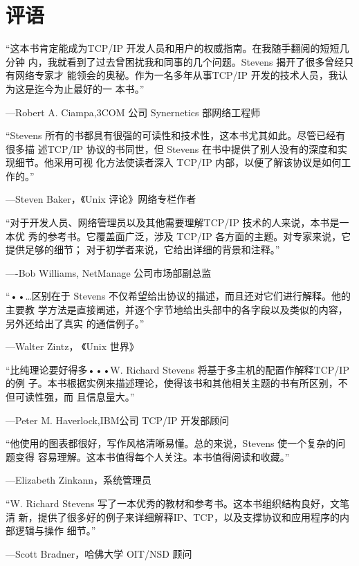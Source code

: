 

\chapter*{评语}
“这本书肯定能成为TCP/IP 开发人员和用户的权威指南。在我随手翻阅的短短几分钟
内，我就看到了过去曾困扰我和同事的几个问题。Stevens 揭开了很多曾经只有网络专家才
能领会的奥秘。作为一名多年从事TCP/IP 开发的技术人员，我认为这是迄今为止最好的一
本书。”
\begin{flushright}
    —Robert A. Ciampa,3COM 公司 Synernetics 部网络工程师
\end{flushright}

“Stevens 所有的书都具有很强的可读性和技术性，这本书尤其如此。尽管已经有很多描
述TCP/IP 协议的书同世，但 Stevens 在书中提供了别人没有的深度和实现细节。他采用可视
化方法使读者深入 TCP/IP 内部，以便了解该协议是如何工作的。”
\begin{flushright}
    —Steven Baker，《Unix 评论》网络专栏作者
\end{flushright}

“对于开发人员、网络管理员以及其他需要理解TCP/IP 技术的人来说，本书是一本优
秀的参考书。它覆盖面广泛，涉及 TCP/IP 各方面的主题。对专家来说，它提供足够的细节；
对于初学者来说，它给出详细的背景和注释。”
\begin{flushright}
    —-Bob Williams, NetManage 公司市场部副总监
\end{flushright}

“••…区别在于 Stevens 不仅希望给出协议的描述，而且还对它们进行解释。他的主要教
学方法是直接阐述，并逐个字节地给出头部中的各字段以及类似的内容，另外还给出了真实
的通信例子。”
\begin{flushright}
    —Walter Zintz， 《Unix 世界》
\end{flushright}

“比纯理论要好得多•••W. Richard Stevens 将基于多主机的配置作解释TCP/IP 的例
子。本书根据实例来描述理论，使得该书和其他相关主题的书有所区别，不但可读性强，而
且信息量大。”
\begin{flushright}
    —Peter M. Haverlock,IBM公司 TCP/IP 开发部顾问
\end{flushright}

“他使用的图表都很好，写作风格清晰易懂。总的来说，Stevens 使一个复杂的问题变得
容易理解。这本书值得每个人关注。本书值得阅读和收藏。”
\begin{flushright}
    —Elizabeth Zinkann，系统管理员
\end{flushright}

“W. Richard Stevens 写了一本优秀的教材和参考书。这本书组织结构良好，文笔清
新，提供了很多好的例子来详细解释IP、TCP，以及支撑协议和应用程序的内部逻辑与操作
细节。”
\begin{flushright}
    —Scott Bradner，哈佛大学 OIT/NSD 顾问
\end{flushright}
